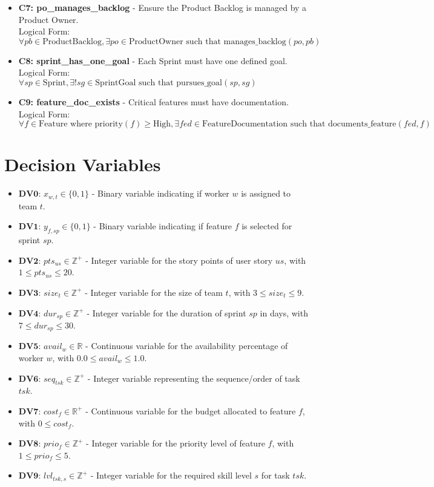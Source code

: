 \documentclass[11pt]{article}
\begin{document}
\begin{itemize}
    \item \textbf{C7: po\_manages\_backlog} - Ensure the Product Backlog is managed by a Product Owner.
    \\Logical Form: $\forall pb \in \text{ProductBacklog}, \exists po \in \text{ProductOwner} \text{ such that } \text{manages\_backlog}(po, pb)$
    
    \item \textbf{C8: sprint\_has\_one\_goal} - Each Sprint must have one defined goal.
    \\Logical Form: $\forall sp \in \text{Sprint}, \exists! sg \in \text{SprintGoal} \text{ such that } \text{pursues\_goal}(sp, sg)$
    
    \item \textbf{C9: feature\_doc\_exists} - Critical features must have documentation.
    \\Logical Form: $\forall f \in \text{Feature} \text{ where } \text{priority}(f) \geq \text{High}, \exists fed \in \text{FeatureDocumentation} \text{ such that } \text{documents\_feature}(fed, f)$
\end{itemize}

\section{Decision Variables}
\begin{itemize}
    \item $\mathbf{DV0}$: $x_{w,t} \in \{0, 1\}$ - Binary variable indicating if worker $w$ is assigned to team $t$.
    \item $\mathbf{DV1}$: $y_{f,sp} \in \{0, 1\}$ - Binary variable indicating if feature $f$ is selected for sprint $sp$.
    \item $\mathbf{DV2}$: $pts_{us} \in \mathbb{Z}^+$ - Integer variable for the story points of user story $us$, with $1 \leq pts_{us} \leq 20$.
    \item $\mathbf{DV3}$: $size_t \in \mathbb{Z}^+$ - Integer variable for the size of team $t$, with $3 \leq size_t \leq 9$.
    \item $\mathbf{DV4}$: $dur_{sp} \in \mathbb{Z}^+$ - Integer variable for the duration of sprint $sp$ in days, with $7 \leq dur_{sp} \leq 30$.
    \item $\mathbf{DV5}$: $avail_w \in \mathbb{R}$ - Continuous variable for the availability percentage of worker $w$, with $0.0 \leq avail_w \leq 1.0$.
    \item $\mathbf{DV6}$: $seq_{tsk} \in \mathbb{Z}^+$ - Integer variable representing the sequence/order of task $tsk$.
    \item $\mathbf{DV7}$: $cost_f \in \mathbb{R}^+$ - Continuous variable for the budget allocated to feature $f$, with $0 \leq cost_f$.
    \item $\mathbf{DV8}$: $prio_f \in \mathbb{Z}^+$ - Integer variable for the priority level of feature $f$, with $1 \leq prio_f \leq 5$.
    \item $\mathbf{DV9}$: $lvl_{tsk, s} \in \mathbb{Z}^+$ - Integer variable for the required skill level $s$ for task $tsk$.
\end{itemize}
\end{document}
